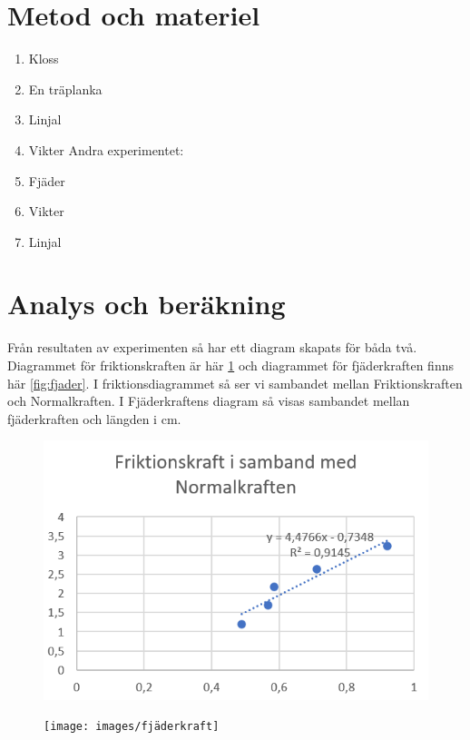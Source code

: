 \documentclass[11p, titlepage, oneside, a4paper]{article}
\begin{document}
    \section{Metod och materiel}
    \begin{enumerate}
        Första experimentet:
        \item Kloss
        \item En träplanka
        \item Linjal
        \item Vikter
        Andra experimentet:
        \item Fjäder
        \item Vikter
        \item Linjal
    \end{enumerate}




    \newpage
    \section{Analys och beräkning}
    Från resultaten av experimenten så har ett diagram skapats för båda två. Diagrammet för friktionskraften är här \ref{fig:friktion} och diagrammet för fjäderkraften finns här \ref{fig:fjader}. I friktionsdiagrammet så ser vi sambandet mellan Friktionskraften och Normalkraften. I Fjäderkraftens diagram så visas sambandet mellan fjäderkraften och längden i cm.

    \begin{figure}
        \centering
        \includegraphics[scale=0.1]{images/friktionskraft}
        \caption{}
        \label{fig:friktion}
    \end{figure}
    \begin{figure}
        \centering
        \texttt{[image: images/fjäderkraft]}
        \caption{}
        \label{fig:fjäder}
    \end{figure}
\end{document}
